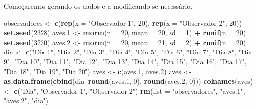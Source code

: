 \documentclass[titlepage, oneside, openany, a4paper]{book}
\newenvironment{Shaded}{\begin{snugshade}}{\end{snugshade}}
\newcommand{\DataTypeTok}[1]{\textcolor[rgb]{0.13,0.29,0.53}{#1}}
\newcommand{\DecValTok}[1]{\textcolor[rgb]{0.00,0.00,0.81}{#1}}
\newcommand{\FloatTok}[1]{\textcolor[rgb]{0.00,0.00,0.81}{#1}}
\newcommand{\KeywordTok}[1]{\textcolor[rgb]{0.13,0.29,0.53}{\textbf{#1}}}
\newcommand{\NormalTok}[1]{#1}
\newcommand{\OperatorTok}[1]{\textcolor[rgb]{0.81,0.36,0.00}{\textbf{#1}}}
\newcommand{\StringTok}[1]{\textcolor[rgb]{0.31,0.60,0.02}{#1}}
\begin{document}
Começaremos gerando os dados e a modificando se necessário.

\begin{Shaded}
\begin{Highlighting}[]
\NormalTok{observadores <-}\StringTok{ }\KeywordTok{c}\NormalTok{(}\KeywordTok{rep}\NormalTok{(}\DataTypeTok{x =} \StringTok{"Observador 1"}\NormalTok{, }\DecValTok{20}\NormalTok{), }\KeywordTok{rep}\NormalTok{(}\DataTypeTok{x =} \StringTok{"Observador 2"}\NormalTok{, }\DecValTok{20}\NormalTok{))}
\KeywordTok{set.seed}\NormalTok{(}\DecValTok{2328}\NormalTok{)}
\NormalTok{aves}\FloatTok{.1}\NormalTok{ <-}\StringTok{ }\KeywordTok{rnorm}\NormalTok{(}\DataTypeTok{n =} \DecValTok{20}\NormalTok{, }\DataTypeTok{mean =} \DecValTok{20}\NormalTok{, }\DataTypeTok{sd =} \DecValTok{1}\NormalTok{) }\OperatorTok{+}\StringTok{ }\KeywordTok{runif}\NormalTok{(}\DataTypeTok{n =} \DecValTok{20}\NormalTok{)}
\KeywordTok{set.seed}\NormalTok{(}\DecValTok{3230}\NormalTok{)}
\NormalTok{aves}\FloatTok{.2}\NormalTok{ <-}\StringTok{ }\KeywordTok{rnorm}\NormalTok{(}\DataTypeTok{n =} \DecValTok{20}\NormalTok{, }\DataTypeTok{mean =} \DecValTok{21}\NormalTok{, }\DataTypeTok{sd =} \DecValTok{2}\NormalTok{) }\OperatorTok{+}\StringTok{ }\KeywordTok{runif}\NormalTok{(}\DataTypeTok{n =} \DecValTok{20}\NormalTok{)}
\NormalTok{dia <-}\StringTok{ }\KeywordTok{c}\NormalTok{(}\StringTok{"Dia 1"}\NormalTok{, }\StringTok{"Dia 2"}\NormalTok{, }\StringTok{"Dia 3"}\NormalTok{, }\StringTok{"Dia 4"}\NormalTok{, }\StringTok{"Dia 5"}\NormalTok{, }\StringTok{"Dia 6"}\NormalTok{, }\StringTok{"Dia 7"}\NormalTok{, }\StringTok{"Dia 8"}\NormalTok{, }\StringTok{"Dia 9"}\NormalTok{, }\StringTok{"Dia 10"}\NormalTok{, }\StringTok{"Dia 11"}\NormalTok{, }\StringTok{"Dia 12"}\NormalTok{, }\StringTok{"Dia 13"}\NormalTok{, }\StringTok{"Dia 14"}\NormalTok{, }\StringTok{"Dia 15"}\NormalTok{, }\StringTok{"Dia 16"}\NormalTok{, }\StringTok{"Dia 17"}\NormalTok{, }\StringTok{"Dia 18"}\NormalTok{, }\StringTok{"Dia 19"}\NormalTok{, }\StringTok{"Dia 20"}\NormalTok{)}
\NormalTok{aves <-}\StringTok{ }\KeywordTok{c}\NormalTok{(aves}\FloatTok{.1}\NormalTok{, aves}\FloatTok{.2}\NormalTok{)}
\NormalTok{aves <-}\StringTok{ }\KeywordTok{as.data.frame}\NormalTok{(}\KeywordTok{cbind}\NormalTok{(dia, }\KeywordTok{round}\NormalTok{(aves}\FloatTok{.1}\NormalTok{, }\DecValTok{0}\NormalTok{), }\KeywordTok{round}\NormalTok{(aves}\FloatTok{.2}\NormalTok{, }\DecValTok{0}\NormalTok{)))}
\KeywordTok{colnames}\NormalTok{(aves) <-}\StringTok{ }\KeywordTok{c}\NormalTok{(}\StringTok{"Dia"}\NormalTok{, }\StringTok{"Observador 1"}\NormalTok{, }\StringTok{"Observador 2"}\NormalTok{)}
\KeywordTok{rm}\NormalTok{(}\DataTypeTok{list =} \StringTok{"observadores"}\NormalTok{, }\StringTok{"aves.1"}\NormalTok{, }\StringTok{"aves.2"}\NormalTok{, }\StringTok{"dia"}\NormalTok{)}
\end{Highlighting}
\end{Shaded}
\end{document}

